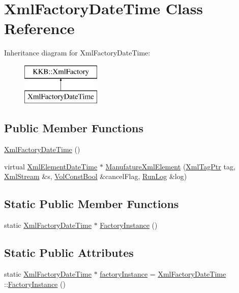 \hypertarget{class_xml_factory_date_time}{}\section{Xml\+Factory\+Date\+Time Class Reference}
\label{class_xml_factory_date_time}
Inheritance diagram for Xml\+Factory\+Date\+Time\+:\begin{figure}[H]
\begin{center}
\leavevmode
\includegraphics[height=2.000000cm]{class_xml_factory_date_time}
\end{center}
\end{figure}
\subsection*{Public Member Functions}
\begin{DoxyCompactItemize}
\item 
\hyperlink{class_xml_factory_date_time_a6b38baaf313ba2bc674282ab5c553188}{Xml\+Factory\+Date\+Time} ()
\item 
virtual \hyperlink{class_k_k_b_1_1_xml_element_date_time}{Xml\+Element\+Date\+Time} $\ast$ \hyperlink{class_xml_factory_date_time_a15232e30a8ef05e5cc1fc1df999c73c4}{Manufature\+Xml\+Element} (\hyperlink{namespace_k_k_b_a9253a3ea8a5da18ca82be4ca2b390ef0}{Xml\+Tag\+Ptr} tag, \hyperlink{class_k_k_b_1_1_xml_stream}{Xml\+Stream} \&s, \hyperlink{namespace_k_k_b_a7d390f568e2831fb76b86b56c87bf92f}{Vol\+Const\+Bool} \&cancel\+Flag, \hyperlink{class_k_k_b_1_1_run_log}{Run\+Log} \&log)
\end{DoxyCompactItemize}
\subsection*{Static Public Member Functions}
\begin{DoxyCompactItemize}
\item 
static \hyperlink{class_xml_factory_date_time}{Xml\+Factory\+Date\+Time} $\ast$ \hyperlink{class_xml_factory_date_time_a0366bf3adf6f6a36de1eac26d7ca2f68}{Factory\+Instance} ()
\end{DoxyCompactItemize}
\subsection*{Static Public Attributes}
\begin{DoxyCompactItemize}
\item 
static \hyperlink{class_xml_factory_date_time}{Xml\+Factory\+Date\+Time} $\ast$ \hyperlink{class_xml_factory_date_time_a0c3cfb11ac3df95148c0ca5c215f0b5c}{factory\+Instance} = \hyperlink{class_xml_factory_date_time}{Xml\+Factory\+Date\+Time} \+::\hyperlink{class_xml_factory_date_time_a0366bf3adf6f6a36de1eac26d7ca2f68}{Factory\+Instance} ()
\end{DoxyCompactItemize}


